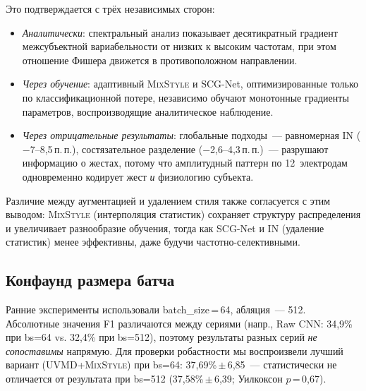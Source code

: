 \documentclass[conference]{IEEEtran}
\newcommand{\pp}{\,п.\,п.}
\newcommand{\mixstyle}{\textsc{MixStyle}}
\newcommand{\uvmd}{\textsc{UVMD}}
\begin{document}
Это подтверждается с трёх независимых сторон:
\begin{itemize}
    \item \emph{Аналитически}: спектральный анализ показывает десятикратный градиент межсубъектной вариабельности от низких к высоким частотам, при этом отношение Фишера движется в противоположном направлении.
    \item \emph{Через обучение}: адаптивный \mixstyle{} и SCG-Net, оптимизированные только по классификационной потере, независимо обучают монотонные градиенты параметров, воспроизводящие аналитическое наблюдение.
    \item \emph{Через отрицательные результаты}: глобальные подходы~--- равномерная IN ($-$7--8,5\pp{}), состязательное разделение ($-$2,6--4,3\pp{})~--- разрушают информацию о жестах, потому что амплитудный паттерн по 12~электродам одновременно кодирует жест \emph{и} физиологию субъекта.
\end{itemize}

Различие между аугментацией и удалением стиля также согласуется с этим выводом: \mixstyle{} (интерполяция статистик) сохраняет структуру распределения и увеличивает разнообразие обучения, тогда как SCG-Net и IN (удаление статистик) менее эффективны, даже будучи частотно-селективными.

\subsection{Конфаунд размера батча}
\label{sec:batchsize}

Ранние эксперименты использовали batch\_size\,=\,64, абляция~--- 512.
Абсолютные значения F1 различаются между сериями (напр., Raw CNN: 34,9\% при bs=64 vs. 32,4\% при bs=512), поэтому результаты разных серий \emph{не сопоставимы} напрямую.
Для проверки робастности мы воспроизвели лучший вариант (\uvmd{}+\mixstyle{}) при bs=64: 37,69\%\,$\pm$\,6,85~--- статистически не отличается от результата при bs=512 (37,58\%\,$\pm$\,6,39; Уилкоксон $p$\,=\,0,67).
\end{document}
